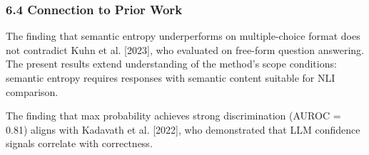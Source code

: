 \subsubsection{6.4 Connection to Prior Work}

The finding that semantic entropy underperforms on multiple-choice format does not contradict Kuhn et al. [2023], who evaluated on free-form question answering. The present results extend understanding of the method's scope conditions: semantic entropy requires responses with semantic content suitable for NLI comparison.

The finding that max probability achieves strong discrimination (AUROC = 0.81) aligns with Kadavath et al. [2022], who demonstrated that LLM confidence signals correlate with correctness.

